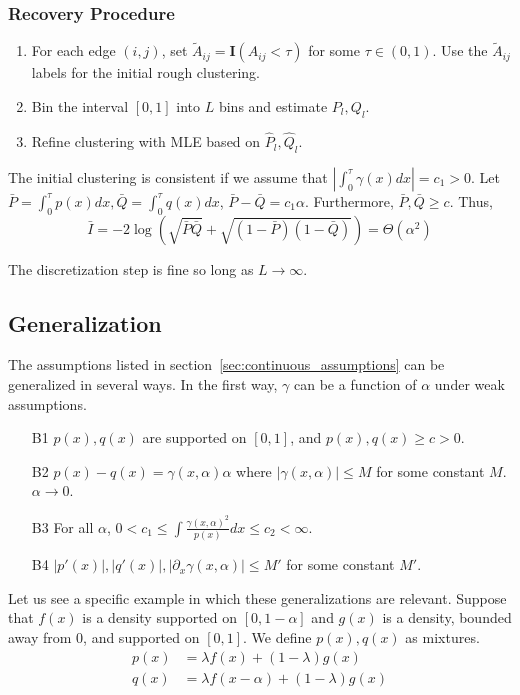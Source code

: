 \documentclass{article}
\begin{document}
\subsubsection{Recovery Procedure}

\begin{enumerate}
\item For each edge $(i,j)$, set $\tilde{A}_{ij} = \mathbf{I}(A_{ij} < \tau)$ for some $\tau \in (0, 1)$. Use the $\tilde{A}_{ij}$ labels for the initial rough clustering.
\item Bin the interval $[0,1]$ into $L$ bins and estimate $P_l, Q_l$.
\item Refine clustering with MLE based on $\hat{P}_l, \hat{Q}_l$.
\end{enumerate}


The initial clustering is consistent if we assume that $\left| \int_0^{\tau} \gamma(x) dx \right| = c_1 > 0$. Let $\bar{P} = \int_0^{\tau} p(x) dx, \bar{Q} = \int_0^{\tau} q(x) dx$, $\bar{P} - \bar{Q} = c_1 \alpha$. Furthermore, $\bar{P}, \bar{Q} \geq c$. Thus, 
\[
\bar{I} = -2 \log \left( \sqrt{\bar{P} \bar{Q}} + \sqrt{(1-\bar{P})(1-\bar{Q})} \right) = \Theta( \alpha^2)
\]

The discretization step is fine so long as $L \rightarrow \infty$. 

\subsection{Generalization}

The assumptions listed in section~\ref{sec:continuous_assumptions} can be generalized in several ways. In the first way, $\gamma$ can be a function of $\alpha$ under weak assumptions.
\begin{enumerate}
\item[B1] $p(x), q(x)$ are supported on $[0,1]$, and $p(x), q(x) \geq c > 0$. 
\item[B2] $p(x) - q(x) = \gamma(x, \alpha) \alpha$ where $|\gamma(x, \alpha)| \leq M$ for some constant $M$. $\alpha \rightarrow 0$.
\item[B3] For all $\alpha$, $0 < c_1 \leq \int \frac{\gamma(x, \alpha)^2}{p(x)} dx \leq c_2 < \infty$. 
\item[B4] $|p'(x)|, |q'(x)|, |\partial_x \gamma(x,\alpha)| \leq M'$ for some constant $M'$. 
\end{enumerate}

Let us see a specific example in which these generalizations are relevant. Suppose that $f(x)$ is a density supported on $[0, 1-\alpha]$ and $g(x)$ is a density, bounded away from 0, and supported on $[0,1]$. We define $p(x), q(x)$ as mixtures.
\begin{align*}
p(x) &= \lambda f(x) + (1-\lambda) g(x)\\
q(x) &= \lambda f(x - \alpha) + (1-\lambda) g(x)
\end{align*}
\end{document}
